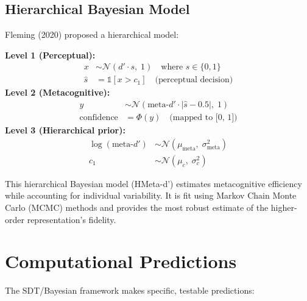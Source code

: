 \documentclass[11pt,a4paper]{report}
\begin{document}
\subsection{Hierarchical Bayesian Model}

Fleming (2020) proposed a hierarchical model:

\begin{mathbox}
\vspace{-6pt}
\textbf{Level 1 (Perceptual):}
\begin{align}
  x &\sim \mathcal{N}(d' \cdot s, \; 1) \quad\text{where } s \in \{0, 1\} \\
  \hat{s} &= \mathbb{1}[x > c_1] \quad\text{(perceptual decision)}
\end{align}
\textbf{Level 2 (Metacognitive):}
\begin{align}
  y &\sim \mathcal{N}(\text{meta-}d' \cdot |\hat{s} - 0.5|, \; 1) \\
  \text{confidence} &= \Phi(y) \quad\text{(mapped to [0, 1])}
\end{align}
\textbf{Level 3 (Hierarchical prior):}
\begin{align}
  \log(\text{meta-}d') &\sim \mathcal{N}(\mu_{\text{meta}}, \; \sigma_{\text{meta}}^2) \\
  c_1 &\sim \mathcal{N}(\mu_c, \; \sigma_c^2)
\end{align}
\vspace{-8pt}
\end{mathbox}

This hierarchical Bayesian model (HMeta-d') estimates metacognitive efficiency while accounting for individual variability. It is fit using Markov Chain Monte Carlo (MCMC) methods and provides the most robust estimate of the higher-order representation's fidelity.

\section{Computational Predictions}

The SDT/Bayesian framework makes specific, testable predictions:
\end{document}
